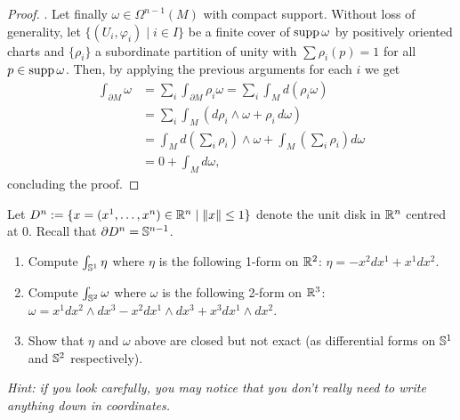 \begin{proof}
  .
  Let finally $\omega\in\Omega^{n-1}(M)$ with compact support.
  Without loss of generality, let $\{(U_i, \varphi_i)\mid i\in I\}$ be a finite cover of $\operatorname{supp} \omega$ by positively oriented charts and $\{\rho_i\}$ a subordinate partition of unity with $\sum \rho_i(p) = 1$ for all $p\in\operatorname{supp} \omega$.
  Then, by applying the previous arguments for each $i$ we get
  \begin{align}
    \int_{\partial M} \omega
    &= \sum_i \int_{\partial M} \rho_i\omega
     = \sum_i \int_M d(\rho_i \omega) \\
    &= \sum_i \int_M (d\rho_i \wedge\omega + \rho_i\, d\omega) \\
    &= \int_M d\left(\sum_i \rho_i\right)\wedge\omega + \int_M \left(\sum_i \rho_i\right) d\omega \\ 
    &= 0 + \int_M d\omega,
  \end{align}
  concluding the proof.
\end{proof}

\begin{exercise}
  Let $D^n := \{x=(x^1, \ldots, x^n)\in\mathbb{R}^n \mid \|x\| \leq 1\}$ denote the unit disk in $\mathbb{R}^n$ centred at $0$. Recall that $\partial D^n = \mathbb{S}^{n-1}$.
  \begin{enumerate}
    \item Compute $\int_{\mathbb{S}^1} \eta$ where $\eta$ is the following 1-form on $\mathbb{R}^2$: $\eta = -x^2 dx^1 + x^1 dx^2$.
    \item Compute $\int_{\mathbb{S}^2} \omega$ where $\omega$ is the following 2-form on $\mathbb{R}^3$: $\omega = x^1 dx^2\wedge dx^3 - x^2 dx^1\wedge dx^3 + x^3 dx^1\wedge dx^2$.
    \item Show that $\eta$ and $\omega$ above are closed but not exact (as differential forms on $\mathbb{S}^1$ and $\mathbb{S}^2$ respectively).
  \end{enumerate}
  \textit{\small Hint: if you look carefully, you may notice that you don't really need to write anything down in coordinates.}
\end{exercise}

